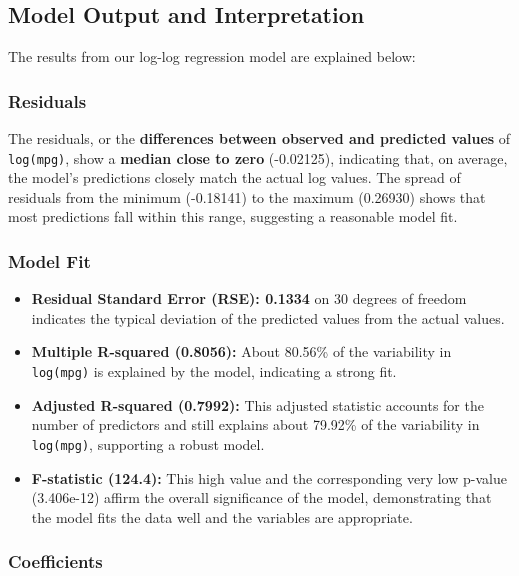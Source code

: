 \documentclass[
  letterpaper,
  DIV=11,
  numbers=noendperiod]{scrreport}
\begin{document}
\subsection{Model Output and
Interpretation}\label{model-output-and-interpretation}

The results from our log-log regression model are explained below:

\subsubsection{Residuals}\label{residuals}

The residuals, or the \textbf{differences between observed and predicted
values} of \texttt{log(mpg)}, show a \textbf{median close to zero}
(-0.02125), indicating that, on average, the model's predictions closely
match the actual log values. The spread of residuals from the minimum
(-0.18141) to the maximum (0.26930) shows that most predictions fall
within this range, suggesting a reasonable model fit.

\subsubsection{Model Fit}\label{model-fit}

\begin{itemize}
\item
  \textbf{Residual Standard Error (RSE): 0.1334} on 30 degrees of
  freedom indicates the typical deviation of the predicted values from
  the actual values.
\item
  \textbf{Multiple R-squared (0.8056):} About 80.56\% of the variability
  in \texttt{log(mpg)} is explained by the model, indicating a strong
  fit.
\item
  \textbf{Adjusted R-squared (0.7992):} This adjusted statistic accounts
  for the number of predictors and still explains about 79.92\% of the
  variability in \texttt{log(mpg)}, supporting a robust model.
\item
  \textbf{F-statistic (124.4):} This high value and the corresponding
  very low p-value (3.406e-12) affirm the overall significance of the
  model, demonstrating that the model fits the data well and the
  variables are appropriate.
\end{itemize}

\subsubsection{Coefficients}\label{coefficients}
\end{document}
